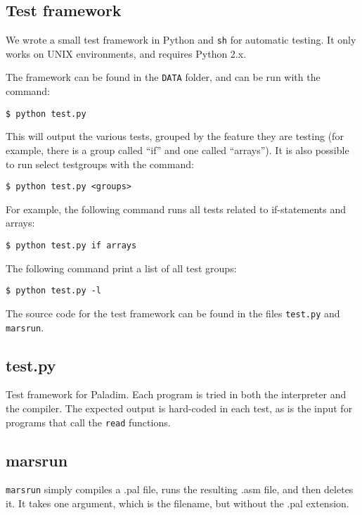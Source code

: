 \documentclass{article}
\begin{document}
\newpage
\begin{appendix}
\section{Test framework}
\label{test}
We wrote a small test framework in Python and \texttt{sh} for automatic testing. It only works on UNIX environments, and
requires Python 2.x.

The framework can be found in the \texttt{DATA} folder,
and can be run with the command:

\begin{verbatim}
$ python test.py
\end{verbatim}
This will output the various tests, grouped by the feature they are testing (for example, there is a group called
``if'' and one called ``arrays''). It is also possible to run select testgroups with the command:

\begin{verbatim}
$ python test.py <groups>
\end{verbatim}
For example, the following command runs all tests related to if-statements and arrays:

\begin{verbatim}
$ python test.py if arrays
\end{verbatim}

The following command print a list of all test groups:

\begin{verbatim}
$ python test.py -l
\end{verbatim}

The source code for the test framework can be found in the files \texttt{test.py} and \texttt{marsrun}.

\subsection{test.py}
Test framework for Paladim. Each program is tried in both the interpreter and the compiler. The expected output
is hard-coded in each test, as is the input for programs that call the \texttt{read} functions.

\subsection{marsrun}
\texttt{marsrun} simply compiles a .pal file, runs the resulting .asm file, and then deletes it. It takes one
argument, which is the filename, but without the .pal extension.



\end{appendix}
\end{document}

